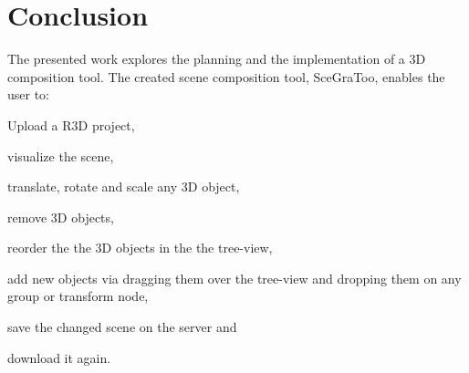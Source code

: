 
\section{Conclusion}\label{results}



The presented work explores the planning and the implementation of a \gls{3D} composition tool. The created scene composition tool, \gls{SceGraToo}, enables the user to:

\begin{itemize*}
  \item Upload a \gls{R3D} project,
  \item visualize the scene,
  \item translate, rotate and scale any 3D object,
  \item remove 3D objects,
  \item reorder the the 3D objects in the the tree-view,
  \item add new objects via dragging them over the tree-view and dropping them on any group or transform node,
  \item save the changed scene on the server and
  \item download it again.
\end{itemize*}

